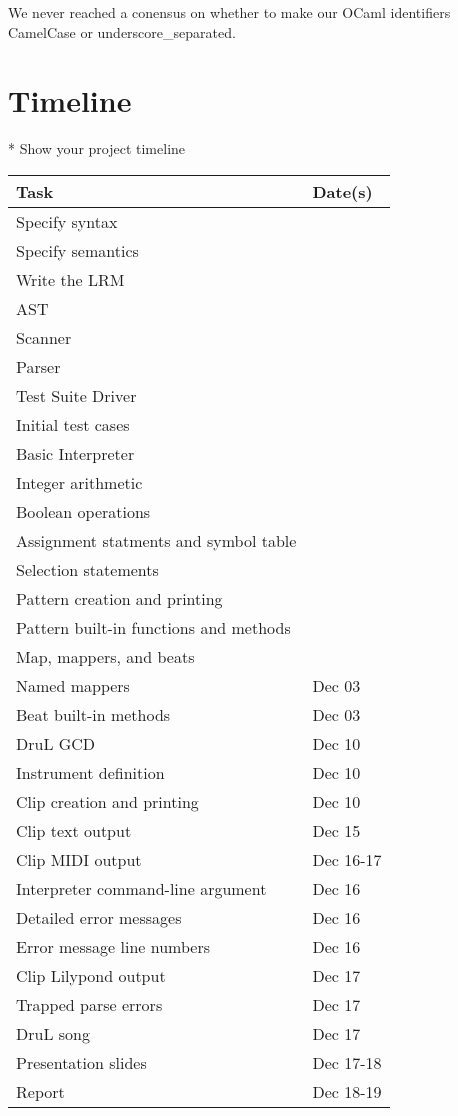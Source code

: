 We never reached a conensus on whether to make our OCaml identifiers CamelCase or underscore\_separated.

\section{Timeline}
* Show your project timeline

\begin{tabular}{ | l | l | } \hline
	\textbf{Task} & \textbf{Date(s)} \\ \hline \hline
	Specify syntax & \\ \hline
	Specify semantics & \\ \hline
	Write the LRM & \\ \hline
	AST & \\ \hline
	Scanner & \\ \hline
	Parser & \\ \hline
	Test Suite Driver & \\ \hline
	Initial test cases & \\ \hline
	Basic Interpreter & \\ \hline
	Integer arithmetic & \\ \hline
	Boolean operations & \\ \hline
	Assignment statments and symbol table & \\ \hline
	Selection statements & \\ \hline
	Pattern creation and printing & \\ \hline
	Pattern built-in functions and methods & \\ \hline
	Map, mappers, and beats & \\ \hline
	Named mappers & Dec 03\\ \hline
	Beat built-in methods & Dec 03\\ \hline
	DruL GCD & Dec 10 \\  \hline
	Instrument definition & Dec 10\\ \hline
	Clip creation and printing & Dec 10\\ \hline
	Clip text output & Dec 15 \\ \hline
	Clip MIDI output & Dec 16-17 \\ \hline
	Interpreter command-line argument & Dec 16 \\ \hline
	Detailed error messages & Dec 16 \\ \hline
	Error message line numbers & Dec 16 \\ \hline
	Clip Lilypond output & Dec 17 \\ \hline
	Trapped parse errors & Dec 17 \\ \hline
	DruL song & Dec 17 \\ \hline
	Presentation slides & Dec 17-18 \\ \hline
	Report & Dec 18-19 \\ \hline
\end{tabular}

